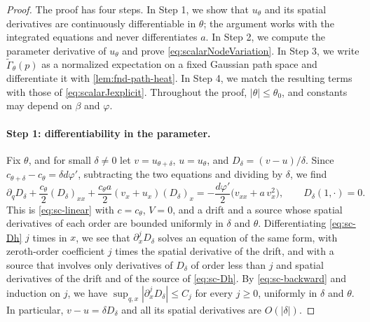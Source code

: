 \begin{proof}
The proof has four steps. In Step 1, we show that $u_\theta$ and its
spatial derivatives are continuously differentiable in $\theta$; the
argument works with the integrated equations and never differentiates
$a$. In Step 2, we compute the parameter derivative of $u_\theta$ and
prove \eqref{eq:scalarNodeVariation}. In Step 3, we write
$\widetilde\Gamma_\theta(p)$ as a normalized expectation on a fixed
Gaussian path space and differentiate it with
\cref{lem:fnd-path-heat}. In Step 4, we match the resulting terms with
those of \eqref{eq:scalarJexplicit}. Throughout the proof,
$|\theta|\le\theta_0$, and constants may depend on $\beta$ and
$\varphi$.

\paragraph{Step 1: differentiability in the parameter.}
Fix $\theta$, and for small $\delta\ne0$ let $v=u_{\theta+\delta}$,
$u=u_\theta$, and $D_\delta=(v-u)/\delta$. Since
$c_{\theta+\delta}-c_\theta=\delta d\varphi'$, subtracting the two
equations and dividing by $\delta$, we find
\begin{equation}\label{eq:sc-Dh}
 \partial_qD_\delta+\frac{c_\theta}2(D_\delta)_{xx}
       +\frac{c_\theta a}2(v_x+u_x)(D_\delta)_x
 =-\frac{d\varphi'}2\bigl(v_{xx}+a\,v_x^2\bigr),\qquad D_\delta(1,\cdot)=0 .
\end{equation}
This is \eqref{eq:sc-linear} with $c=c_\theta$, $V=0$, and a drift and
a source whose spatial derivatives of each order are bounded uniformly
in $\delta$ and $\theta$. Differentiating \eqref{eq:sc-Dh} $j$ times in
$x$, we see that $\partial_x^jD_\delta$ solves an equation of the same
form, with zeroth-order coefficient $j$ times the spatial derivative
of the drift, and with a source that involves only derivatives of
$D_\delta$ of order less than $j$ and spatial derivatives of the drift
and of the source of \eqref{eq:sc-Dh}. By \eqref{eq:sc-backward} and
induction on $j$, we have
$\sup_{q,x}|\partial_x^jD_\delta|\le C_j$ for every $j\ge0$, uniformly
in $\delta$ and $\theta$. In particular, $v-u=\delta D_\delta$ and all
its spatial derivatives are $O(|\delta|)$.


\end{proof}
